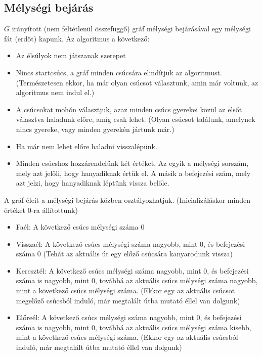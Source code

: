 \documentclass[margin=0px]{article}
\begin{document}
\subsection{Mélységi bejárás}
$G$ irányított (nem feltétlenül összefüggő) gráf mélységi bejárásával egy mélységi fát (erdőt) kapunk. Az algoritmus a következő:
\begin{itemize}
    \item Az élsúlyok nem játszanak szerepet
    \item Nincs startcsúcs, a gráf minden csúcsára elindítjuk az algoritmust. (Természetesen ekkor, ha már olyan csúcsot választunk, amin már voltunk, az algoritmus nem indul el.)
    \item A csúcsokat mohón választjuk, azaz minden csúcs gyerekei közül az elsőt választva haladunk előre, amíg csak lehet. (Olyan csúcsot találunk, amelynek nincs gyereke, vagy minden gyerekén jártunk már.)
    \item Ha már nem lehet előre haladni visszalépünk.
    \item Minden csúcshoz hozzárendelünk két értéket. Az egyik a mélységi sorszám, mely azt jelöli, hogy hanyadiknak értük el. A másik a befejezési szám, mely azt jelzi, hogy hanyadiknak léptünk vissza belőle.
\end{itemize}
A gráf éleit a mélységi bejárás közben osztályozhatjuk. (Inicializáláskor minden értéket 0-ra állítottunk)
\begin{itemize}
    \item Faél: A következő csúcs mélységi száma 0
    \item Visszaél: A következő csúcs mélységi száma nagyobb, mint 0, és befejezési száma 0 (Tehát az aktuális út egy előző csúcsára kanyarodunk vissza)
    \item Keresztél: A következő csúcs mélységi száma nagyobb, mint 0, és befejezési száma is nagyobb, mint 0, továbbá az aktuális csúcs mélységi száma nagyobb, mint a következő csúcs mélységi száma. (Ekkor egy az aktuális csúcsot megelőző csúcsból induló, már megtalált útba mutató éllel van dolgunk)
    \item Előreél: A következő csúcs mélységi száma nagyobb, mint 0, és befejezési száma is nagyobb, mint 0, továbbá az aktuális csúcs mélységi száma kisebb, mint a következő csúcs mélységi száma. (Ekkor egy az aktuális csúcsból induló, már megtalált útba mutató éllel van dolgunk)
\end{itemize}
\end{document}
